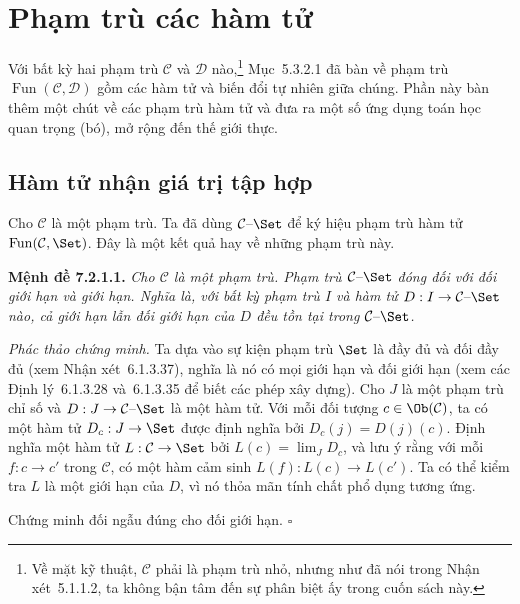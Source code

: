 \section{Phạm trù các hàm tử}

Với bất kỳ hai phạm trù $\mathcal C$ và $\mathcal D$ nào,\footnote{Về mặt kỹ thuật, $\mathcal C$ phải là phạm trù nhỏ, nhưng như đã nói trong Nhận xét~5.1.1.2, ta không bận tâm đến sự phân biệt ấy trong cuốn sách này.} Mục~5.3.2.1 đã bàn về phạm trù $\operatorname{Fun}(\mathcal C,\mathcal D)$ gồm các hàm tử và biến đổi tự nhiên giữa chúng. Phần này bàn thêm một chút về các phạm trù hàm tử và đưa ra một số ứng dụng toán học quan trọng (bó), mở rộng đến thế giới thực.

\subsection{Hàm tử nhận giá trị tập hợp}

Cho $\mathcal C$ là một phạm trù. Ta đã dùng $\mathcal C\text{--}\Set$ để ký hiệu phạm trù hàm tử $\operatorname{Fun}(\mathcal C,\Set)$. Đây là một kết quả hay về những phạm trù này.

\noindent\textbf{Mệnh đề 7.2.1.1.}\keepwithnext
\emph{Cho $\mathcal C$ là một phạm trù. Phạm trù $\mathcal C\text{--}\Set$ đóng đối với đối giới hạn và giới hạn. Nghĩa là, với bất kỳ phạm trù $I$ và hàm tử $D:I\to\mathcal C\text{--}\Set$ nào, cả giới hạn lẫn đối giới hạn của $D$ đều tồn tại trong $\mathcal C\text{--}\Set$.}

\noindent\textit{Phác thảo chứng minh.}
Ta dựa vào sự kiện phạm trù $\Set$ là đầy đủ và đối đầy đủ (xem Nhận xét~6.1.3.37), nghĩa là nó có mọi giới hạn và đối giới hạn (xem các Định lý~6.1.3.28 và~6.1.3.35 để biết các phép xây dựng). Cho $J$ là một phạm trù chỉ số và $D:J\to\mathcal C\text{--}\Set$ là một hàm tử. Với mỗi đối tượng $c\in\Ob(\mathcal C)$, ta có một hàm tử $D_c:J\to\Set$ được định nghĩa bởi $D_c(j)=D(j)(c)$. Định nghĩa một hàm tử $L:\mathcal C\to\Set$ bởi $L(c)=\lim_J D_c$, và lưu ý rằng với mỗi $f:c\to c'$ trong $\mathcal C$, có một hàm cảm sinh $L(f):L(c)\to L(c')$. Ta có thể kiểm tra $L$ là một giới hạn của $D$, vì nó thỏa mãn tính chất phổ dụng tương ứng.

Chứng minh đối ngẫu đúng cho đối giới hạn.
\hfill$\square$

